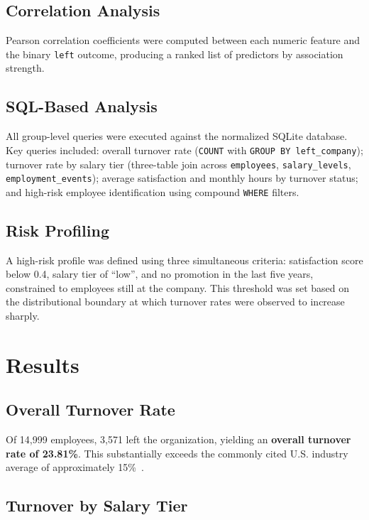 \documentclass[conference]{IEEEtran}
\begin{document}
\subsection{Correlation Analysis}

Pearson correlation coefficients were computed between each numeric feature
and the binary \texttt{left} outcome, producing a ranked list of predictors by
association strength.

\subsection{SQL-Based Analysis}

All group-level queries were executed against the normalized SQLite database.
Key queries included: overall turnover rate (\texttt{COUNT} with
\texttt{GROUP BY left\_company}); turnover rate by salary tier (three-table
join across \texttt{employees}, \texttt{salary\_levels},
\texttt{employment\_events}); average satisfaction and monthly hours by
turnover status; and high-risk employee identification using compound
\texttt{WHERE} filters.

\subsection{Risk Profiling}

A high-risk profile was defined using three simultaneous criteria:
satisfaction score below 0.4, salary tier of ``low'', and no promotion in
the last five years, constrained to employees still at the company. This
threshold was set based on the distributional boundary at which turnover
rates were observed to increase sharply.

\section{Results}
\label{sec:results}

\subsection{Overall Turnover Rate}

Of 14,999 employees, 3,571 left the organization, yielding an \textbf{overall
turnover rate of 23.81\%}. This substantially exceeds the commonly cited U.S.
industry average of approximately 15\%~\cite{bls2023}.

\subsection{Turnover by Salary Tier}
\end{document}
